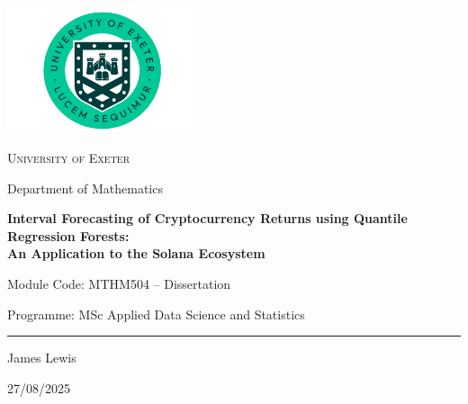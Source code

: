 \thispagestyle{empty}
\begin{titlepage}
  \centering
  \vspace*{0.5cm}
  \includegraphics[width=0.42\textwidth]{Uni-Exeter-logo-portrait-1.png}

  \vspace{1.2cm}
  {\scshape\Large University of Exeter\par}
  {\large Department of Mathematics\par}

  \vspace{1.6cm}
  {\Huge\bfseries Interval Forecasting of Cryptocurrency Returns using Quantile Regression Forests:\\
  An Application to the Solana Ecosystem\par}

  \vspace{1cm}
  {\large Module Code: MTHM504 -- Dissertation\par}
  {\large Programme: MSc Applied Data Science and Statistics\par}

  \vspace{1.2cm}
  \rule{\textwidth}{0.4pt}

  \vspace{0.8cm}
  {\Large James Lewis\par}

  \vfill
  {\large 27/08/2025\par}
\end{titlepage}

\clearpage
{}
